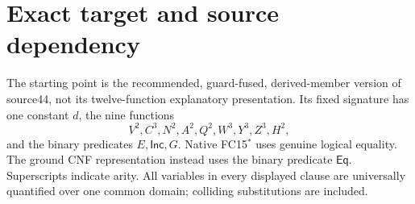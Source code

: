 \newcommand{\srEq}{\mathsf{Eq}}
\newcommand{\srInc}{\mathsf{Inc}}
\newcommand{\srCon}{\operatorname{Con}}
\newcommand{\srcl}[1]{\langle #1\rangle}
\newcommand{\srrho}{\rho}
\newtheorem{srtheorem}{Theorem}
\newtheorem{srlemma}[srtheorem]{Lemma}

\begin{abstract}
The source44 nine-function closure kernels FC15$^*$ and FC16$^*$ have
respectively 29 and 30 universal clauses after treating equality as a
predicate and adding the published congruence completion. Seven function
congruence clauses can be removed while preserving consistency, provably
in ZFC. The resulting ground search retains function congruence only for
assignment evaluation $V$ and assignment update $C$. Class constructors are reconstructed by
their incidence profiles; witness functions are reconstructed after the
equality quotient. The resulting exact payloads have 22 clauses, 58
literals and 1,195 template bits, or 23 clauses, 62 literals and 1,402
bits for the extensional control. Two further exact redundancies, for the
branch guard and explicit reflexivity, give final payloads of 20 clauses,
53 literals and 1,134 bits, or 21 clauses, 57 literals and 1,341 bits.
The reduction is a theorem about a
finite formalism and its refutation-search specification. No binary
Turing machine or state saving is inferred from these counts.
\end{abstract}

\section{Exact target and source dependency}

The starting point is the recommended, guard-fused, derived-member version
of source44, not its twelve-function explanatory presentation. Its fixed
signature has one constant $d$, the nine functions
\[
V^2,C^3,N^2,A^2,Q^2,W^3,Y^3,Z^3,H^2,
\]
and the binary predicates $E,\srInc,G$. Native FC15$^*$ uses genuine
logical equality. The ground CNF representation instead uses the binary
predicate $\srEq$. Superscripts indicate arity. All variables in every
displayed clause are universally quantified over one common domain;
colliding substitutions are included.

